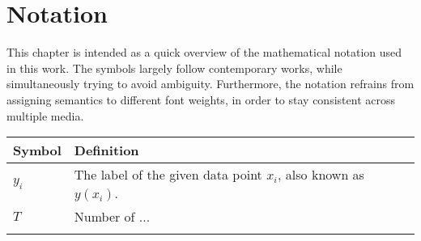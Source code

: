 \chapter*{Notation}
\label{ch:notation}


This chapter is intended as a quick overview of the mathematical notation used in this work.
The symbols largely follow contemporary works, while simultaneously trying to avoid ambiguity.
Furthermore, the notation refrains from assigning semantics to different font weights, in order to stay consistent across multiple media.

\begin{tabularx}{\textwidth}{l X}
    \toprule
    Symbol & Definition \\
    \midrule
    $y_i$ & The label of the given data point $x_i$, also known as $y(x_i)$. \\ \addlinespace
    $T$ & Number of ... \\ \addlinespace
    \bottomrule
\end{tabularx}
\label{tab:notation}